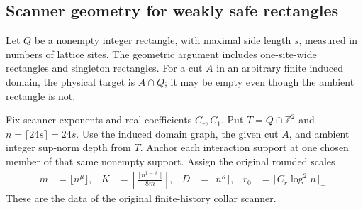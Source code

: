 \subsection{Scanner geometry for weakly safe rectangles}
\label{sec:rectangle_bootstrap_geometry}

Let $Q$ be a nonempty integer rectangle, with maximal side length $s$,
measured in numbers of lattice sites.
The geometric argument includes one-site-wide rectangles and singleton
rectangles.
For a cut $A$ in an arbitrary finite induced domain, the physical target
is $A\cap Q$; it may be empty even though the ambient rectangle is not.

\begin{definition}
    \label{def:rectangle_bootstrap_scanner}
    \leanok
    Fix scanner exponents and real coefficients $C_r,C_1$.
    Put $T=Q\cap\mathbb Z^2$ and $n=\lceil24s\rceil=24s$.
    Use the induced domain graph, the given cut $A$, and
    ambient integer sup-norm depth from $T$.
    Anchor each interaction support at one chosen member of that same
    nonempty support.
    Assign the original rounded scales
    \begin{align}
        m & =\lfloor n^\mu\rfloor,
          & K                      & =\left\lfloor\frac{\lfloor n^{1-\ell}\rfloor}{8m}\right\rfloor,
          & D                      & =\lceil n^\kappa\rceil,
          & r_0                    & =\lceil C_r\log^2n\rceil_+.
        \label{eq:rectangle_bootstrap_scales}
    \end{align}
    These are the data of the original finite-history collar scanner.
\end{definition}

